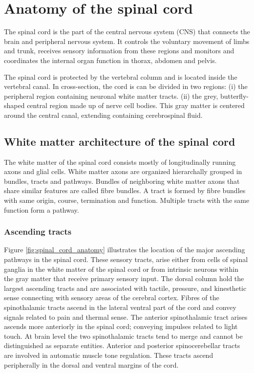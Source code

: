 \section{Anatomy of the spinal cord}
The spinal cord is the part of the central nervous system (CNS) that connects the brain and peripheral nervous system. It controls the voluntary movement of limbs and trunk, receives sensory information from these regions and monitors and coordinates the internal organ function in thorax, abdomen and pelvis. 

The spinal cord is protected by the vertebral column and is located inside the vertebral canal. In cross-section, the cord is can be divided in two regions: (i) the peripheral region containing neuronal white matter tracts. (ii) the grey, butterfly-shaped central region made up of nerve cell bodies. This gray matter is centered around the central canal, extending containing cerebrospinal fluid.

\subsection*{White matter architecture of the spinal cord}
The white matter of the spinal cord consists mostly of longitudinally running axons and glial cells. White matter axons are organized hierarchally grouped in bundles, tracts and pathways. Bundles of neighboring white matter axons that share similar features are called fibre bundles. A tract is formed by fibre bundles with same origin, course, termination and function. Multiple tracts with the same function form a pathway.

\subsubsection*{Ascending tracts}
\label{sec:chap2:ascendingtracts}
Figure \ref{fig:spinal_cord_anatomy} illustrates the location of the major ascending pathways in the spinal cord. These sensory tracts, arise either from cells of spinal ganglia in the white matter of the spinal cord or from intrinsic neurons within the gray matter that receive primary sensory input. The dorsal column hold the largest ascending tracts and are associated with tactile, pressure, and kinesthetic sense connecting with sensory areas of the cerebral cortex. Fibres of the spinothalamic tracts ascend in the lateral ventral part of the cord and convey signals related to pain and thermal sense. The anterior spinothalamic tract arises ascends more anteriorly in the spinal cord; conveying impulses related to light touch. At brain level the two spinothalamic tracts tend to merge and cannot be distinguished as separate entities. Anterior and posterior spinocerebellar tracts are involved in automatic muscle tone regulation. These tracts ascend peripherally in the dorsal and ventral margins of the cord.

